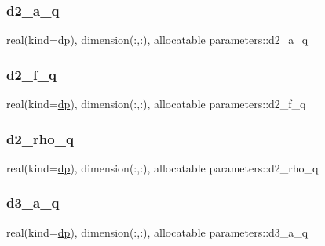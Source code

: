 \subsubsection{\texorpdfstring{d2\+\_\+a\+\_\+q}{d2\_a\_q}}
{\footnotesize\ttfamily real(kind=\mbox{\hyperlink{namespaceparameters_a52f8c6351fd79345d8811e065bcbbb37}{dp}}), dimension(\+:,\+:), allocatable parameters\+::d2\+\_\+a\+\_\+q}

\mbox{\label{namespaceparameters_a4e57ed84b90c4ca5998a9cdaa8ccb2da}} 
\subsubsection{\texorpdfstring{d2\+\_\+f\+\_\+q}{d2\_f\_q}}
{\footnotesize\ttfamily real(kind=\mbox{\hyperlink{namespaceparameters_a52f8c6351fd79345d8811e065bcbbb37}{dp}}), dimension(\+:,\+:), allocatable parameters\+::d2\+\_\+f\+\_\+q}

\mbox{\label{namespaceparameters_a0234a871e1ff1d0be38099df82c5e698}} 
\subsubsection{\texorpdfstring{d2\+\_\+rho\+\_\+q}{d2\_rho\_q}}
{\footnotesize\ttfamily real(kind=\mbox{\hyperlink{namespaceparameters_a52f8c6351fd79345d8811e065bcbbb37}{dp}}), dimension(\+:,\+:), allocatable parameters\+::d2\+\_\+rho\+\_\+q}

\mbox{\label{namespaceparameters_a1449283e577e2769bd8bb5d57dbf1876}} 
\subsubsection{\texorpdfstring{d3\+\_\+a\+\_\+q}{d3\_a\_q}}
{\footnotesize\ttfamily real(kind=\mbox{\hyperlink{namespaceparameters_a52f8c6351fd79345d8811e065bcbbb37}{dp}}), dimension(\+:,\+:), allocatable parameters\+::d3\+\_\+a\+\_\+q}

\mbox{\label{namespaceparameters_ada2cda17d0e9bccb3581a5b22a05f876}} 
